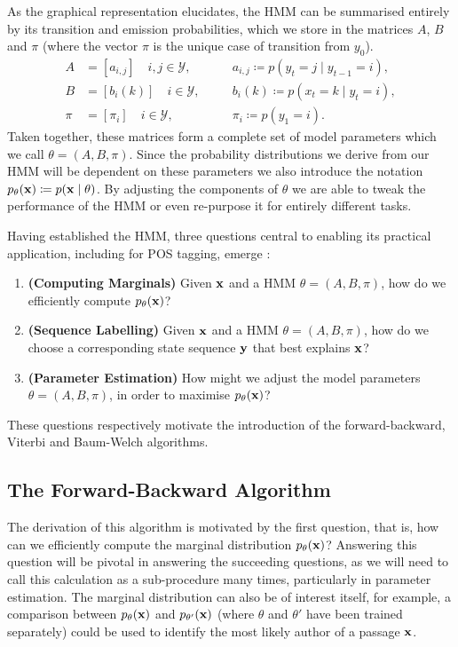 \documentclass[../main.tex]{subfiles}
\begin{document}
As the graphical representation elucidates, the HMM can be summarised entirely by its transition and emission probabilities, which we store in the matrices $A$, $B$ and $\pi$ (where the vector $\pi$ is the unique case of transition from $y_0$).
\begin{align*}
    A &= [ a_{i,j} ] \quad i,j \in \mathcal{Y}, & \quad & a_{i,j} \coloneqq p(y_t = j \mid y_{t-1} = i), \\
    B  &= [ b_i(k) ] \quad i \in \mathcal{Y}, & \quad  & b_i(k) \coloneqq p(x_t = k \mid y_t = i), \\
    \pi &= [ \pi_i ] \quad i \in \mathcal{Y}, & \quad & \pi_i \coloneqq p(y_1 = i).
\end{align*}
Taken together, these matrices form a complete set of model parameters which we call $\theta = (A,B,\pi)$.
Since the probability distributions we derive from our HMM will be dependent on these parameters we also introduce the notation $p_\theta(\mathbf{x}) \coloneqq p(\mathbf{x} \mid \theta)$.
By adjusting the components of $\theta$ we are able to tweak the performance of the HMM or even re-purpose it for entirely different tasks.

Having established the HMM, three questions central to enabling its practical application, including for POS tagging, emerge \autocite{rabiner-1989-tutorial}:
\begin{enumerate}
    \item{\textbf{(Computing Marginals)}} Given $\mathbf{x}$ and a HMM $\theta = (A,B,\pi)$, how do we efficiently compute $p_\theta(\mathbf{x})$? \label{q:key-q1}
    \item{\textbf{(Sequence Labelling)}} Given $\mathbf{x}$ and a HMM $\theta = (A,B,\pi)$, how do we choose a corresponding state sequence $\mathbf{y}$ that best explains $\mathbf{x}$? \label{q:key-q2}
    \item{\textbf{(Parameter Estimation)}} How might we adjust the model parameters $\theta = (A,B,\pi)$, in order to maximise $p_\theta(\mathbf{x})$? \label{q:key-q3}
\end{enumerate}
These questions respectively motivate the introduction of the forward-backward, Viterbi and Baum-Welch algorithms.

\subsection{The Forward-Backward Algorithm} \label{sec:fb-algo}

The derivation of this algorithm is motivated by the first question, that is, how can we efficiently compute the marginal distribution $p_\theta(\mathbf{x})$? Answering this question will be pivotal in answering the succeeding questions, as we will need to call this calculation as a sub-procedure many times, particularly in parameter estimation.
The marginal distribution can also be of interest itself, for example, a comparison between $p_\theta(\mathbf{x})$ and $p_{\theta'}(\mathbf{x})$ (where $\theta$ and $\theta'$ have been trained separately) could be used to identify the most likely author of a passage $\mathbf{x}$.
\end{document}
